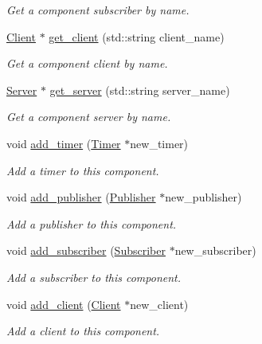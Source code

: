 \begin{DoxyCompactItemize}
\begin{DoxyCompactList}\small\item\em Get a component subscriber by name. \end{DoxyCompactList}\item 
\hyperlink{classzcm_1_1Client}{Client} $\ast$ \hyperlink{classzcm_1_1Component_a89e3f610505b007767f10235b4ea8c20}{get\+\_\+client} (std\+::string client\+\_\+name)
\begin{DoxyCompactList}\small\item\em Get a component client by name. \end{DoxyCompactList}\item 
\hyperlink{classzcm_1_1Server}{Server} $\ast$ \hyperlink{classzcm_1_1Component_a80e221012442119feb53740510242117}{get\+\_\+server} (std\+::string server\+\_\+name)
\begin{DoxyCompactList}\small\item\em Get a component server by name. \end{DoxyCompactList}\item 
void \hyperlink{classzcm_1_1Component_ac9b656236674930c58f7dbfebb063da9}{add\+\_\+timer} (\hyperlink{classzcm_1_1Timer}{Timer} $\ast$new\+\_\+timer)
\begin{DoxyCompactList}\small\item\em Add a timer to this component. \end{DoxyCompactList}\item 
void \hyperlink{classzcm_1_1Component_a3d70420843fc7e0ff2d3d2edc422e992}{add\+\_\+publisher} (\hyperlink{classzcm_1_1Publisher}{Publisher} $\ast$new\+\_\+publisher)
\begin{DoxyCompactList}\small\item\em Add a publisher to this component. \end{DoxyCompactList}\item 
void \hyperlink{classzcm_1_1Component_ac07614093c36e61704d166f00f14c22e}{add\+\_\+subscriber} (\hyperlink{classzcm_1_1Subscriber}{Subscriber} $\ast$new\+\_\+subscriber)
\begin{DoxyCompactList}\small\item\em Add a subscriber to this component. \end{DoxyCompactList}\item 
void \hyperlink{classzcm_1_1Component_ad71bf4cebc218089642d16f697a493fa}{add\+\_\+client} (\hyperlink{classzcm_1_1Client}{Client} $\ast$new\+\_\+client)
\begin{DoxyCompactList}\small\item\em Add a client to this component. \end{DoxyCompactList}\item 

\end{DoxyCompactItemize}
